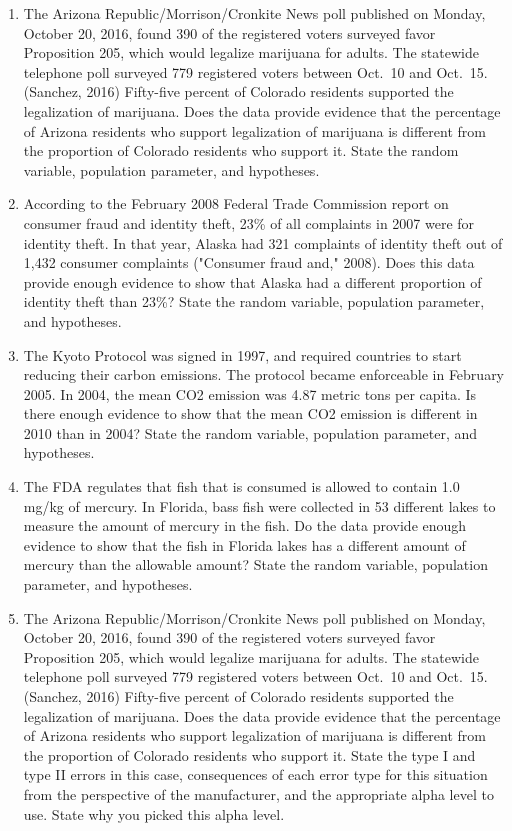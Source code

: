 \documentclass[
]{book}
\begin{document}
\begin{enumerate}
\def\labelenumi{\arabic{enumi}.}
\item
  The Arizona Republic/Morrison/Cronkite News poll published on Monday, October 20, 2016, found 390 of the registered voters surveyed favor Proposition 205, which would legalize marijuana for adults. The statewide telephone poll surveyed 779 registered voters between Oct.~10 and Oct.~15. (Sanchez, 2016) Fifty-five percent of Colorado residents supported the legalization of marijuana. Does the data provide evidence that the percentage of Arizona residents who support legalization of marijuana is different from the proportion of Colorado residents who support it. State the random variable, population parameter, and hypotheses.
\item
  According to the February 2008 Federal Trade Commission report on consumer fraud and identity theft, 23\% of all complaints in 2007 were for identity theft. In that year, Alaska had 321 complaints of identity theft out of 1,432 consumer complaints ("Consumer fraud and," 2008). Does this data provide enough evidence to show that Alaska had a different proportion of identity theft than 23\%? State the random variable, population parameter, and hypotheses.
\item
  The Kyoto Protocol was signed in 1997, and required countries to start reducing their carbon emissions. The protocol became enforceable in February 2005. In 2004, the mean CO2 emission was 4.87 metric tons per capita. Is there enough evidence to show that the mean CO2 emission is different in 2010 than in 2004? State the random variable, population parameter, and hypotheses.
\item
  The FDA regulates that fish that is consumed is allowed to contain 1.0 mg/kg of mercury. In Florida, bass fish were collected in 53 different lakes to measure the amount of mercury in the fish. Do the data provide enough evidence to show that the fish in Florida lakes has a different amount of mercury than the allowable amount? State the random variable, population parameter, and hypotheses.
\item
  The Arizona Republic/Morrison/Cronkite News poll published on Monday, October 20, 2016, found 390 of the registered voters surveyed favor Proposition 205, which would legalize marijuana for adults. The statewide telephone poll surveyed 779 registered voters between Oct.~10 and Oct.~15. (Sanchez, 2016) Fifty-five percent of Colorado residents supported the legalization of marijuana. Does the data provide evidence that the percentage of Arizona residents who support legalization of marijuana is different from the proportion of Colorado residents who support it. State the type I and type II errors in this case, consequences of each error type for this situation from the perspective of the manufacturer, and the appropriate alpha level to use. State why you picked this alpha level.

\end{enumerate}
\end{document}
